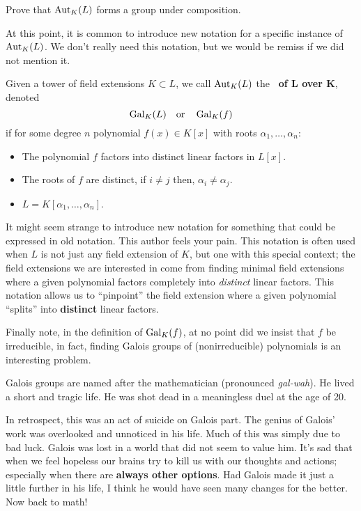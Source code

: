 \documentclass{ximera}
\begin{document}
\begin{exercise}
  Prove that $\operatorname{Aut}_K(L)$ forms a group under composition.
\end{exercise}


At this point, it is common to introduce new notation for a specific
instance of $\operatorname{Aut}_K(L)$. We don't really need this notation, but we would
be remiss if we did not mention it.


Given a tower of field extensions $K\subset L$, we call $\operatorname{Aut}_K(L)$
the \textbf{~of $\boldsymbol L$ over $\boldsymbol K$},
denoted
  \[
  \gal_K(L)\index{galKL@$\gal_K(L)$} \quad\text{or}\quad\gal_K(f)
  \]
  if for some degree $n$ polynomial $f(x)\in K[x]$ with roots $\alpha_1,\dots, \alpha_n$:
  \begin{itemize}
  \item The polynomial $f$ factors into distinct linear factors in
    $L[x]$.
  \item The roots of $f$ are distinct, if $i\ne j$ then, $\alpha_i \ne
    \alpha_j$.
  \item $L = K[\alpha_1,\dots,\alpha_n]$.
  \end{itemize}
It might seem strange to introduce new notation for something that
could be expressed in old notation. This author feels your pain. This
notation is often used when $L$ is not just any field extension of
$K$, but one with this special context; the field extensions we are
interested in come from finding minimal field extensions where a given
polynomial factors completely into \textit{distinct} linear factors.
This notation allows us to ``pinpoint'' the field extension where a
given polynomial ``splits'' into \textbf{distinct} linear factors.

Finally note, in the definition of $\operatorname{Gal}_K(f)$, at no point did we
insist that $f$ be irreducible, in fact, finding Galois groups of
(nonirreducible) polynomials is an interesting problem.


Galois groups are named after the mathematician  (pronounced
\textit{gal-wah}). He lived a short and tragic life. He was shot dead
in a meaningless duel at the age of 20.

In retrospect, this was an act of suicide on Galois part. The genius
of Galois' work was overlooked and unnoticed in his life.  Much of this
was simply due to bad luck. Galois was lost in a world that did not
seem to value him.  It's sad that when we feel hopeless our brains try
to kill us with our thoughts and actions; especially when there are
\textbf{always other options}. Had Galois
made it just a little further in his life, I think he would have seen
many changes for the better. Now back to math!
\end{document}

